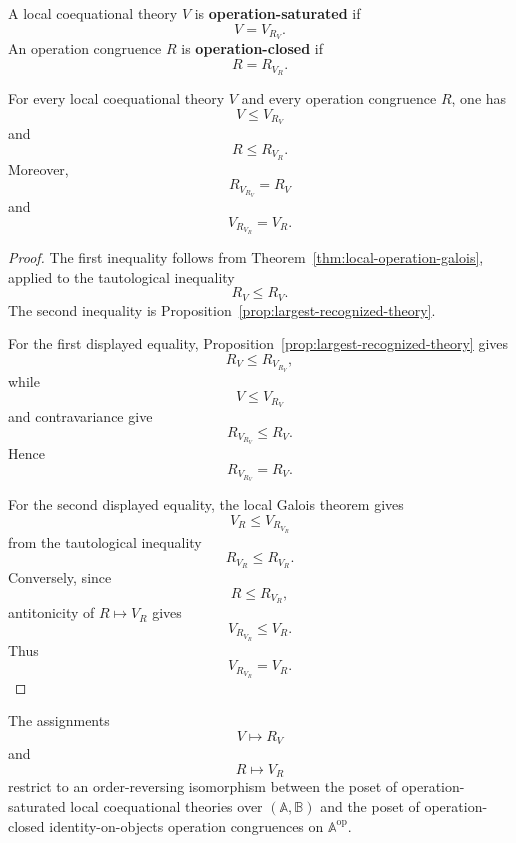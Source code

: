 \begin{definition}
\label{def:operation-saturated-and-closed}
    A local coequational theory \(V\) is \textbf{operation-saturated} if
    \[
        V=V_{R_V}.
    \]
    An operation congruence \(R\) is \textbf{operation-closed} if
    \[
        R=R_{V_R}.
    \]
\end{definition}

\begin{lemma}
\label{lem:operation-closure-operators}
    For every local coequational theory \(V\) and every operation congruence
    \(R\), one has
    \[
        V\leq V_{R_V}
    \]
    and
    \[
        R\leq R_{V_R}.
    \]
    Moreover,
    \[
        R_{V_{R_V}}=R_V
    \]
    and
    \[
        V_{R_{V_R}}=V_R.
    \]
\end{lemma}

\begin{proof}
    The first inequality follows from
    Theorem~\ref{thm:local-operation-galois}, applied to the tautological
    inequality
    \[
        R_V\leq R_V.
    \]
    The second inequality is Proposition~\ref{prop:largest-recognized-theory}.

    For the first displayed equality,
    Proposition~\ref{prop:largest-recognized-theory} gives
    \[
        R_V\leq R_{V_{R_V}},
    \]
    while
    \[
        V\leq V_{R_V}
    \]
    and contravariance give
    \[
        R_{V_{R_V}}\leq R_V.
    \]
    Hence
    \[
        R_{V_{R_V}}=R_V.
    \]

    For the second displayed equality, the local Galois theorem gives
    \[
        V_R\leq V_{R_{V_R}}
    \]
    from the tautological inequality
    \[
        R_{V_R}\leq R_{V_R}.
    \]
    Conversely, since
    \[
        R\leq R_{V_R},
    \]
    antitonicity of \(R\mapsto V_R\) gives
    \[
        V_{R_{V_R}}\leq V_R.
    \]
    Thus
    \[
        V_{R_{V_R}}=V_R.
    \]
\end{proof}

\begin{theorem}
\label{thm:local-algebraic-eilenberg}
    The assignments
    \[
        V\longmapsto R_V
    \]
    and
    \[
        R\longmapsto V_R
    \]
    restrict to an order-reversing isomorphism between the poset of
    operation-saturated local coequational theories over
    \((\mathbb A,\mathbb B)\) and the poset of operation-closed
    identity-on-objects operation congruences on
    \(\mathbb A^{\mathrm{op}}\).
\end{theorem}

